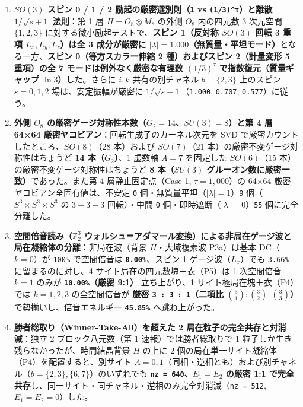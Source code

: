 \documentclass[
  a4paper,
]{ltjsarticle}
\providecommand{\tightlist}{%
  \setlength{\itemsep}{0pt}\setlength{\parskip}{0pt}}
\begin{document}
\begin{enumerate}
\def\labelenumi{\arabic{enumi}.}
\tightlist
\item
  \textbf{\(SO(3)\) スピン 0 / 1 / 2 励起の厳密選別則（\texttt{1} vs
  \texttt{(1/3)\^{}τ}）と離散 \(1/\sqrt{s+1}\) 法則}：第 1 層
  \(H = O_8 \otimes M_8\) の外側 \(O_8\) 内の四元数 3 次元空間
  \(\{1, 2, 3\}\) に対する微小励起テストで、\textbf{スピン 1（反対称
  \(SO(3)\) 回転 3 重項 \(L_x, L_y, L_z\)）は全 3 成分が厳密に
  \(|\lambda| = 1.000\)（無質量・平坦モード）}となる一方、\textbf{スピン
  0（等方スカラー伸縮 2 種）およびスピン 2（計量変形 5 重項）の全 7
  モードは例外なく厳密な有理数 \((1/3)^\tau\) で指数復元（質量ギャップ
  \(\ln 3\)）}した。さらに \(i, k\) 共有の別チャネル \(b = \{2, 3\}\)
  上のスピン \(s = 0, 1, 2\) 場は、安定振幅が厳密に
  \(1/\sqrt{s+1}\)（\texttt{1.000}, \texttt{0.707},
  \texttt{0.577}）に従う。
\item
  \textbf{外側 \(O_8\)
  の厳密ゲージ対称性本数（\(G_2 = 14\)、\(SU(3) = 8\)）と第 4 層 64×64
  厳密ヤコビアン}：回転生成子のカーネル次元を SVD
  で厳密カウントしたところ、\(SO(8)\)（28 本）および \(SO(7)\)（21
  本）の厳密不変ゲージ対称性はちょうど \textbf{14 本（\(G_2\)）}、1
  虚数軸 \(A=7\) を固定した \(SO(6)\)（15
  本）の厳密不変ゲージ対称性はちょうど \textbf{8 本（\(SU(3)\)
  グルーオン数に厳密一致）}であった。また第 4 層静止固定点（Case 1,
  \(\tau = 1,000\)）の 64×64 厳密ヤコビアン全固有値は、不安定 \texttt{0}
  個・無質量平坦（\(|\lambda| = 1\)）\texttt{9}
  個（\(S^3\times S^3\times S^3\) の \(3+3+3\) 回転）・中間 \texttt{0}
  個・即時遮断（\(|\lambda| = 0\)）\texttt{55} 個に完全分離した。
\item
  \textbf{空間倍音読み（\(\mathbb{Z}_2^3\)
  ウォルシュ＝アダマール変換）による非局在ゲージ波と局在凝縮体の分離}：非局在波（背景
  \(H\)・大域複素波 P3a）は基本 DC（\(k=0\)）が \texttt{100\%}
  で空間倍音は \textbf{\texttt{0.00\%}}、スピン 1
  ゲージ波（\(L_x\)）でも \texttt{3.66\%} に留まるのに対し、4
  サイト局在の四元数塊＋衣（P5）は 1 次空間倍音 \(k=1\) のみが
  \textbf{\texttt{10.00\%}（厳密 9:1）} 立ち上がり、1
  サイト極局在塊＋衣（P4）では \(k = 1, 2, 3\) の全空間倍音が
  \textbf{厳密 \texttt{3\ :\ 3\ :\ 1}（二項比
  \(\binom{3}{1}:\binom{3}{2}:\binom{3}{3}\)）}
  で勢揃いし、倍音エネルギー \textbf{\texttt{45.85\%}} へ跳ね上がった。
\item
  \textbf{勝者総取り（Winner-Take-All）を超えた 2
  局在粒子の完全共存と対消滅}：独立 2 ブロック八元数（第 1
  速報）では勝者総取りで 1 粒子しか生き残らなかったが、時間結晶背景
  \(H\) の上に 2 個の局在単一サイト凝縮体（P4）を配置すると、別サイト
  \(A = 0, 1\)（同相・逆相とも）および別チャネル（\(b = \{2,3\}, \{6,7\}\)）のいずれでも
  \textbf{\texttt{nz\ =\ 640}、\(E_1 = E_2\) の厳密 1:1
  で完全共存}し、同一サイト・同チャネル・逆相のみ完全対消滅（\texttt{nz\ =\ 512},
  \(E_1 = E_2 = 0\)）した。
\end{enumerate}
\end{document}
